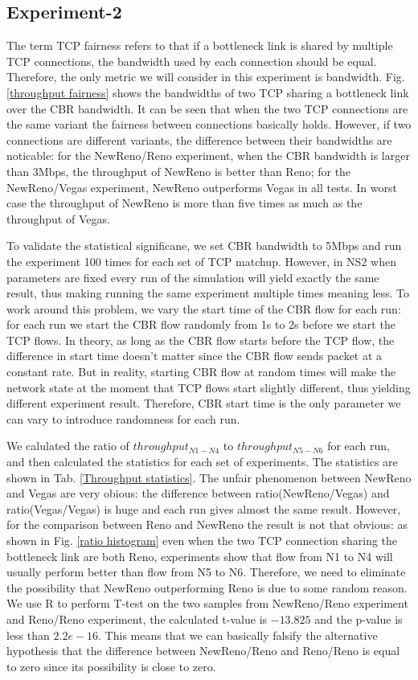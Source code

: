 \documentclass[USenglish,oneside,twocolumn]{article}
\begin{document}
\subsection{Experiment-2}

The term TCP fairness refers to that if a bottleneck link is shared by multiple TCP connections, the bandwidth used by each connection should be equal. Therefore, the only metric we will consider in this experiment is bandwidth. Fig. \ref{throughput fairness} shows the bandwidths of two TCP sharing a bottleneck link over the CBR bandwidth. It can be seen that when the two TCP connections are the same variant the fairness between connections basically holds. However, if two connections are different variants, the difference between their bandwidths are noticable: for the NewReno/Reno experiment, when the CBR bandwidth is larger than 3Mbps, the throughput of NewReno is better than Reno; for the NewReno/Vegas experiment, NewReno outperforms Vegas in all tests. In worst case the throughput of NewReno is more than five times as much as the throughput of Vegas.

To validate the statistical significane, we set CBR bandwidth to 5Mbps and run the experiment 100 times for each set of TCP matchup. However, in NS2 when parameters are fixed every run of the simulation will yield exactly the same result, thus making running the same experiment multiple times meaning less. To work around this problem, we vary the start time of the CBR flow for each run: for each run we start the CBR flow randomly from 1s to 2s before we start the TCP flows. In theory, as long as the CBR flow starts before the TCP flow, the difference in start time doesn't matter since the CBR flow sends packet at a constant rate. But in reality, starting CBR flow at random times will make the network state at the moment that TCP flows start slightly different, thus yielding different experiment result. Therefore, CBR start time is the only parameter we can vary to introduce randomness for each run.

We calulated the ratio of \(throughput_{N1-N4}\) to \(throughput_{N5-N6}\) for each run, and then calculated the statistics for each set of experiments. The statistics are shown in Tab. \ref{Throughput statistics}. The unfair phenomenon between NewReno and Vegas are very obious: the difference between ratio(NewReno/Vegas) and ratio(Vegas/Vegas) is huge and each run gives almost the same result. However, for the comparison between Reno and NewReno the result is not that obvious: as shown in Fig. \ref{ratio histogram} even when the two TCP connection sharing the bottleneck link are both Reno, experiments show that flow from N1 to N4 will usually perform better than flow from N5 to N6. Therefore, we need to eliminate the possibility that NewReno outperforming Reno is due to some random reason. We use R to perform T-test on the two samples from NewReno/Reno experiment and Reno/Reno experiment, the calculated t-value is \(-13.825\) and the p-value is less than \(2.2e-16\). This means that we can basically falsify the alternative hypothesis that the difference between NewReno/Reno and Reno/Reno is equal to zero since its possibility is close to zero.
\end{document}
